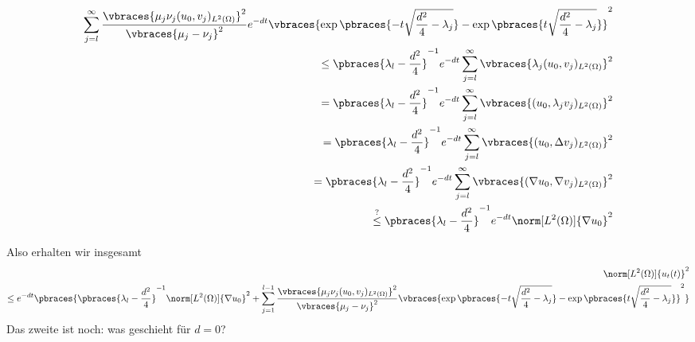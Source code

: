 \begin{solution}
\begin{enumerate}[label = (\roman*)]
	\begin{align*}
		\sum_{j=l}^\infty \frac{\vbraces{\mu_j\nu_j(u_0, v_j)_{L^2(\Omega)}}^2}{\vbraces{\mu_j - \nu_j}^2} e^{-d t}\vbraces{\exp\pbraces{-t\sqrt{\frac{d^2}{4} - \lambda_j} } - \exp\pbraces{t\sqrt{\frac{d^2}{4} - \lambda_j} }}^2 \\
		\leq \pbraces{\lambda_l - \frac{d^2}{4}}^{-1} e^{-d t} \sum_{j=l}^\infty \vbraces{\lambda_j (u_0, v_j)_{L^2(\Omega)}}^2 \\
		= \pbraces{\lambda_l - \frac{d^2}{4}}^{-1} e^{-d t} \sum_{j=l}^\infty \vbraces{ (u_0, \lambda_j v_j)_{L^2(\Omega)}}^2 \\
		= \pbraces{\lambda_l - \frac{d^2}{4}}^{-1} e^{-d t} \sum_{j=l}^\infty \vbraces{ (u_0, \Delta v_j)_{L^2(\Omega)}}^2 \\
		= \pbraces{\lambda_l - \frac{d^2}{4}}^{-1} e^{-d t} \sum_{j=l}^\infty \vbraces{ (\nabla u_0, \nabla v_j)_{L^2(\Omega)}}^2 \\
		\stackrel{?}{\leq} \pbraces{\lambda_l - \frac{d^2}{4}}^{-1} e^{-d t} \norm[L^2(\Omega)]{\nabla u_0}^2
	\end{align*}
	
	Also erhalten wir insgesamt
	\begin{align*}
		\norm[L^2(\Omega)]{u_t(t)}^2 \\
		 \leq e^{- d t} \pbraces{ \pbraces{\lambda_l - \frac{d^2}{4}}^{-1} \norm[L^2(\Omega)]{\nabla u_0}^2 + \sum_{j=1}^{l-1} \frac{\vbraces{\mu_j\nu_j(u_0, v_j)_{L^2(\Omega)}}^2}{\vbraces{\mu_j - \nu_j}^2} \vbraces{\exp\pbraces{-t\sqrt{\frac{d^2}{4} - \lambda_j} } - \exp\pbraces{t\sqrt{\frac{d^2}{4} - \lambda_j} }}^2}
	\end{align*}
	Das zweite  ist noch: was geschieht für $d = 0$?
\end{enumerate}
    
\end{solution}

